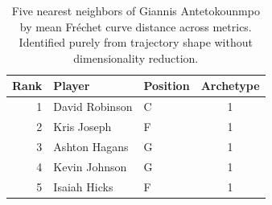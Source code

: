 \begin{table}[htbp]
  \centering\small
  \begin{tabular}{rllc}
    \toprule
    Rank & Player & Position & Archetype \\
    \midrule
    1 & David Robinson & C & 1 \\
    2 & Kris Joseph & F & 1 \\
    3 & Ashton Hagans & G & 1 \\
    4 & Kevin Johnson & G & 1 \\
    5 & Isaiah Hicks & F & 1 \\
    \bottomrule
  \end{tabular}
  \caption{Five nearest neighbors of Giannis Antetokounmpo by mean Fr\'{e}chet curve distance across metrics. Identified purely from trajectory shape without dimensionality reduction.}
  \label{tab:Giannis_Antetokounmpo_frechet_curve_neighbors}
\end{table}

